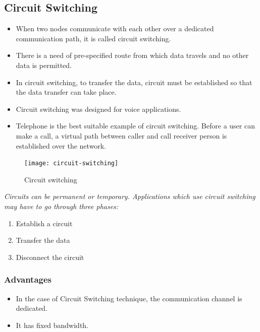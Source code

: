 \subsection{Circuit Switching}
\begin{multicols}{2}
	\begin{itemize}
		\item When two nodes communicate with each other over a dedicated communication path, it is called
		circuit switching.
		\item There is a need of pre-specified route from which data travels and no other data is permitted.
		\item In circuit switching, to transfer the data, circuit must be established so that the data transfer can take place.
		\item Circuit switching was designed for voice applications.
		
		\item Telephone is the best suitable example of circuit switching. Before a user can make a call, a virtual path between caller and call receiver person is established over the network.
	\end{itemize}
\end{multicols}


\begin{figure}[hpt]
	\begin{center}
		\texttt{[image: circuit-switching]}
		\caption{Circuit switching}
		\label{fig:circuit-switching}
	\end{center}
\end{figure}

\textit{Circuits can be permanent or temporary. Applications which use circuit switching may have to go through three phases:}

\begin{multicols}{3}
	\begin{enumerate}[label=\alph*.]
		\item Establish a circuit
		\item Transfer the data
		\item Disconnect the circuit
	\end{enumerate}
\end{multicols}



\begin{multicols}{2}
	\subsubsection*{Advantages}
	\begin{itemize}
		\item In the case of Circuit Switching technique, the communication channel is dedicated.
		\item It has fixed bandwidth.
	\end{itemize}
\end{multicols}




